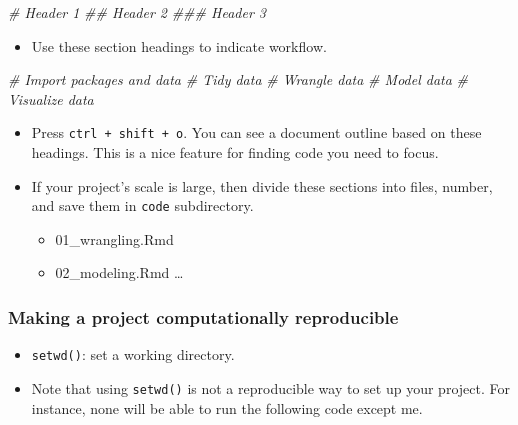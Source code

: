 \documentclass[
]{book}
\newenvironment{Shaded}{\begin{snugshade}}{\end{snugshade}}
\newcommand{\CommentTok}[1]{\textcolor[rgb]{0.56,0.35,0.01}{\textit{#1}}}
\providecommand{\tightlist}{%
  \setlength{\itemsep}{0pt}\setlength{\parskip}{0pt}}
\begin{document}
\begin{Shaded}
\begin{Highlighting}[]
\CommentTok{\# Header 1}
\CommentTok{\#\# Header 2}
\CommentTok{\#\#\# Header 3}
\end{Highlighting}
\end{Shaded}

\begin{itemize}
\tightlist
\item
  Use these section headings to indicate workflow.
\end{itemize}

\begin{Shaded}
\begin{Highlighting}[]
\CommentTok{\# Import packages and data}
\CommentTok{\# Tidy data}
\CommentTok{\# Wrangle data}
\CommentTok{\# Model data}
\CommentTok{\# Visualize data}
\end{Highlighting}
\end{Shaded}

\begin{itemize}
\item
  Press \texttt{ctrl\ +\ shift\ +\ o}. You can see a document outline based on these headings. This is a nice feature for finding code you need to focus.
\item
  If your project's scale is large, then divide these sections into files, number, and save them in \texttt{code} subdirectory.

  \begin{itemize}
  \tightlist
  \item
    01\_wrangling.Rmd
  \item
    02\_modeling.Rmd
    \ldots{}
  \end{itemize}
\end{itemize}

\hypertarget{making-a-project-computationally-reproducible}{%
\subsubsection{Making a project computationally reproducible}\label{making-a-project-computationally-reproducible}}

\begin{itemize}
\item
  \texttt{setwd()}: set a working directory.
\item
  Note that using \texttt{setwd()} is not a reproducible way to set up your project. For instance, none will be able to run the following code except me.
\end{itemize}
\end{document}
